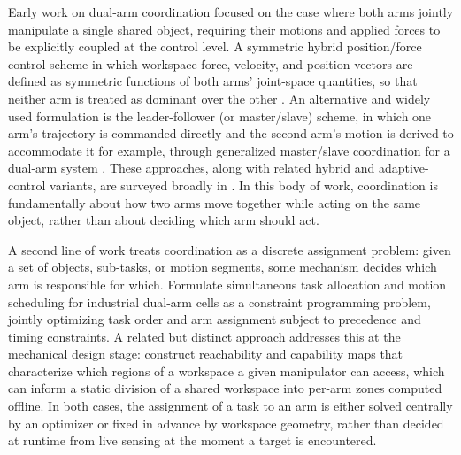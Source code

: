 \documentclass[letterpaper, 10 pt, conference]{ieeeconf}  %
\begin{document}
Early work on dual-arm coordination focused on the case where both arms jointly manipulate a single shared object, requiring their motions and applied forces to be explicitly coupled at the control level. A symmetric hybrid position/force control scheme in which workspace force, velocity, and position vectors are defined as symmetric functions of both arms' joint-space quantities, so that neither arm is treated as dominant over the other \cite{uchiyama1988symmetric}. An alternative and widely
used formulation is the leader-follower (or master/slave) scheme, in which one arm's trajectory is commanded directly and the second arm's motion is derived to accommodate it for example, through generalized master/slave coordination for a dual-arm
system \cite{Caccavale2025}. These approaches, along with related hybrid and adaptive-control variants, are surveyed broadly in \cite{smith2012dual}. In this body of work, coordination is fundamentally about how two arms move together while acting on the same object, rather than about deciding which arm should act. 

A second line of work treats coordination as a discrete assignment problem: given a set of objects, sub-tasks, or motion segments, some mechanism decides which arm is responsible for which. \cite{behrens2019constraint} Formulate simultaneous task allocation and motion scheduling for industrial dual-arm cells as a constraint programming problem, jointly optimizing task order and arm assignment subject to precedence and timing constraints. A related but distinct approach addresses this at the mechanical design stage: \cite{zacharias2007capturing} construct reachability and capability maps that characterize which regions of a workspace a given manipulator can access, which can inform a static division of a shared workspace into per-arm zones computed offline. In both cases, the assignment of a task to an arm is either solved centrally by an optimizer or fixed in advance by workspace geometry, rather than decided at runtime from live sensing at the moment a target is encountered.
\end{document}

